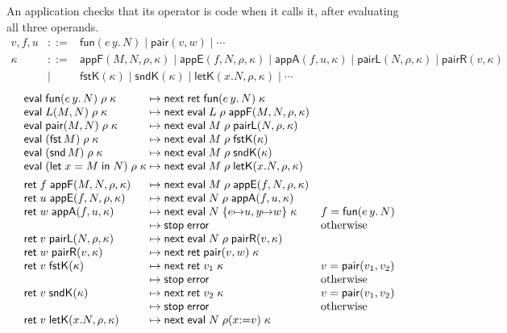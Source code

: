 \documentclass[10pt]{article}
\theoremstyle{acmplain}
\newcommand{\key}[1]{\mathsf{#1}}
\newcommand{\Let}{\key{let}\;}
\newcommand{\In}{\;\key{in}\;}
\newcommand{\fun}[1]{\key{fun}(#1)}
\newcommand{\pair}[2]{\key{pair}(#1, #2)}
\newcommand{\FST}{\key{fst}\,}
\newcommand{\SND}{\key{snd}\,}
\newcommand{\ext}[3]{#1(#2{:=}#3)}
\newcommand{\ev}[3]{\key{eval}\;#1\;#2\;#3}
\newcommand{\rt}[2]{\key{ret}\;#1\;#2}
\newcommand{\nxt}{\key{next}\;}
\newcommand{\stp}{\key{stop}\;}
\newcommand{\error}{\key{error}}
\newcommand{\pairV}[2]{\key{pair}(#1, #2)}
\newcommand{\funV}[1]{\key{fun}(#1)}
\newcommand{\Kf}[2]{\key{#1}(#2)}
\begin{document}
An application checks that its operator is code when it calls it, after
evaluating all three operands.
\[
\begin{array}{rcl}
  v, f, u &::=& \funV{e\, y.\, N} \mid \pairV{v}{w} \mid \cdots \\
  \kappa &::=& \Kf{appF}{M, N, \rho, \kappa} \mid \Kf{appE}{f, N, \rho, \kappa} \mid \Kf{appA}{f, u, \kappa}
    \mid \Kf{pairL}{N, \rho, \kappa} \mid \Kf{pairR}{v, \kappa} \\
  &\mid& \Kf{fstK}{\kappa} \mid \Kf{sndK}{\kappa} \mid \Kf{letK}{x.N, \rho, \kappa} \mid \cdots
\end{array}
\]
\[
\begin{array}{@{}l@{\;\mapsto\;}l@{\quad}l@{}}
  \ev{\fun{e\,y.\,N}}{\rho}{\kappa} & \nxt \rt{\funV{e\, y.\, N}}{\kappa} \\
  \ev{L(M, N)}{\rho}{\kappa} & \nxt \ev{L}{\rho}{\Kf{appF}{M, N, \rho, \kappa}} \\
  \ev{\pair{M}{N}}{\rho}{\kappa} & \nxt \ev{M}{\rho}{\Kf{pairL}{N, \rho, \kappa}} \\
  \ev{(\FST M)}{\rho}{\kappa} & \nxt \ev{M}{\rho}{\Kf{fstK}{\kappa}} \\
  \ev{(\SND M)}{\rho}{\kappa} & \nxt \ev{M}{\rho}{\Kf{sndK}{\kappa}} \\
  \ev{(\Let x = M \In N)}{\rho}{\kappa} & \nxt \ev{M}{\rho}{\Kf{letK}{x.N, \rho, \kappa}} \\[1ex]
  \rt{f}{\Kf{appF}{M, N, \rho, \kappa}} & \nxt \ev{M}{\rho}{\Kf{appE}{f, N, \rho, \kappa}} \\
  \rt{u}{\Kf{appE}{f, N, \rho, \kappa}} & \nxt \ev{N}{\rho}{\Kf{appA}{f, u, \kappa}} \\
  \rt{w}{\Kf{appA}{f, u, \kappa}} & \nxt \ev{N}{\{e {\mapsto} u, y {\mapsto} w\}}{\kappa} & f = \funV{e\, y.\, N} \\
  & \stp \error & \text{otherwise} \\
  \rt{v}{\Kf{pairL}{N, \rho, \kappa}} & \nxt \ev{N}{\rho}{\Kf{pairR}{v, \kappa}} \\
  \rt{w}{\Kf{pairR}{v, \kappa}} & \nxt \rt{\pairV{v}{w}}{\kappa} \\
  \rt{v}{\Kf{fstK}{\kappa}} & \nxt \rt{v_1}{\kappa} & v = \pairV{v_1}{v_2} \\
  & \stp \error & \text{otherwise} \\
  \rt{v}{\Kf{sndK}{\kappa}} & \nxt \rt{v_2}{\kappa} & v = \pairV{v_1}{v_2} \\
  & \stp \error & \text{otherwise} \\
  \rt{v}{\Kf{letK}{x.N, \rho, \kappa}} & \nxt \ev{N}{\ext{\rho}{x}{v}}{\kappa}
\end{array}
\]
\end{document}
